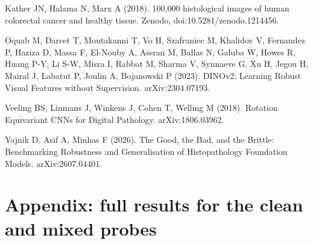 \documentclass[11pt,a4paper]{article}
\begin{document}
\begin{list}{}{\setlength{\leftmargin}{1.5em}\setlength{\itemindent}{-1.5em}\setlength{\itemsep}{0.25em}\setlength{\parsep}{0pt}}
\item Kather JN, Halama N, Marx A (2018). 100,000 histological images of human colorectal cancer and healthy tissue. Zenodo, doi:10.5281/zenodo.1214456.
\item Oquab M, Darcet T, Moutakanni T, Vo H, Szafraniec M, Khalidov V, Fernandez P, Haziza D, Massa F, El-Nouby A, Assran M, Ballas N, Galuba W, Howes R, Huang P-Y, Li S-W, Misra I, Rabbat M, Sharma V, Synnaeve G, Xu H, Jegou H, Mairal J, Labatut P, Joulin A, Bojanowski P (2023). DINOv2: Learning Robust Visual Features without Supervision. arXiv:2304.07193.
\item Veeling BS, Linmans J, Winkens J, Cohen T, Welling M (2018). Rotation Equivariant CNNs for Digital Pathology. arXiv:1806.03962.
\item Yajnik D, Asif A, Minhas F (2026). The Good, the Bad, and the Brittle: Benchmarking Robustness and Generalisation of Histopathology Foundation Models. arXiv:2607.04401.
\end{list}

\clearpage
\appendix
\section*{Appendix: full results for the clean and mixed probes}

\renewcommand{\topfraction}{0.95}\renewcommand{\textfraction}{0.02}\renewcommand{\floatpagefraction}{0.9}

\end{document}

